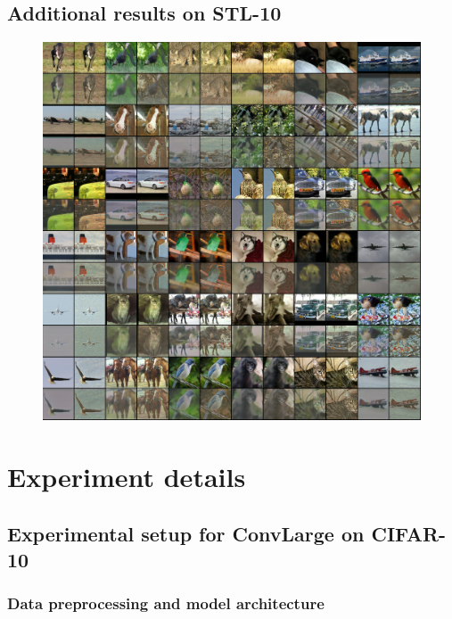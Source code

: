 \clearpage
\subsection{Additional results on STL-10}

\begin{figure}[h]
	\centering
    \includegraphics[width=\textwidth]{images/hybridnet_stl10}
    \label{hybridnetA:fig:stl10}
\end{figure}

\FloatBarrier

\section{Experiment details}

\subsection{Experimental setup for ConvLarge on CIFAR-10}
\subsubsection{Data preprocessing and model architecture}

